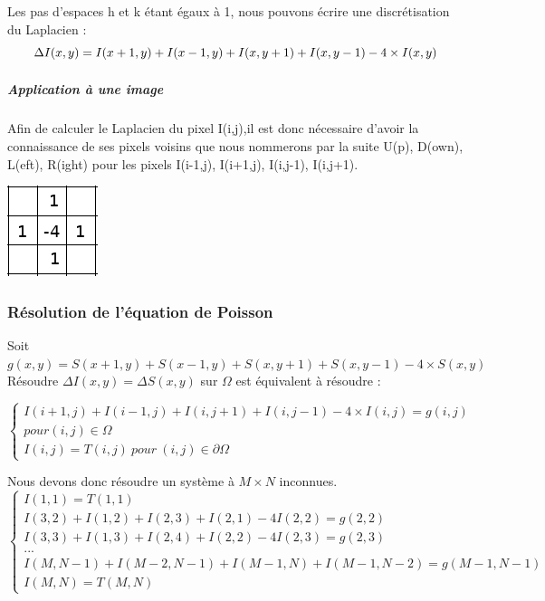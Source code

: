 Les pas d'espaces h et k étant égaux à 1, nous pouvons écrire une discrétisation du Laplacien  :
\begin{equation*}
     \Delta I(x,y) =  I(x+1,y) + I(x-1,y)+ I(x,y+1) + I(x,y-1) - 4\times I(x,y)  \\
\end{equation*}

\subparagraph{Application à une image }
Afin de calculer le Laplacien du pixel I(i,j),il est donc nécessaire d'avoir la connaissance de ses pixels voisins que nous nommerons par la suite U(p), D(own), L(eft), R(ight) pour les pixels I(i-1,j), I(i+1,j), I(i,j-1), I(i,j+1). 

\begin{center}
    \includegraphics[scale = 0.8]{Images/Laplacian.png}
\end{center}

\subsubsection{Résolution de l'équation de Poisson} 
Soit $g(x,y) = S(x+1,y) + S(x-1,y)+ S(x,y+1) + S(x,y-1) - 			4\times S(x,y)$\\
Résoudre $\Delta I(x,y) = \Delta S(x,y)$ sur $\Omega$ est équivalent à résoudre :\\
\begin{center}
\begin{equation*}
    \left \{
    \begin{aligned}
    I(i+1,j) + I(i-1,j)+ I(i,j+1) + I(i, j-1) - 4\times 			I(i,j)= g(i,j)\\ pour (i,j)\in \Omega \\
    I(i,j) = T(i,j) \ pour \ (i,j) \in \partial \Omega
    \end{aligned}
    \right.
\end{equation*}
\end{center}
Nous devons donc résoudre un système à $M\times N $ inconnues.
\begin{equation}
\left\{
\begin{aligned}
I(1,1) = T(1,1)\\
I(3,2)+I(1,2)+ I(2,3)+I(2,1)-4I(2,2) =g(2,2) \\
I(3,3)+I(1,3)+ I(2,4)+I(2,2)-4I(2,3) =g(2,3)             \\
... \\
I(M,N-1)+I(M-2,N-1)+ I(M-1,N)+I(M-1,N-2) =g(M-1,N-1)\\
I(M, N) = T(M, N)
\end{aligned}
\right.
\end{equation}

